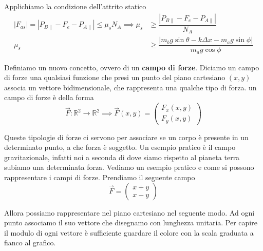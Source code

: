 \documentclass{rapport}
\begin{document}
Applichiamo la condizione dell'attrito statico 
\begin{align*}
|F_{as}| = | P_{B\parallel} - F_e  - P_{A\parallel} | \leq \mu_s N_A \implies \mu_s &\geq \dfrac{ | P_{B\parallel} - F_e  - P_{A\parallel} |}{N_A}\\
\mu_s&\geq \dfrac{ | m_bg\sin\theta - k\Delta x  - m_ag\sin\phi |}{m_ag\cos\phi}
\end{align*}

\newpage
Definiamo un nuovo concetto, ovvero di un \textbf{campo di forze}. Diciamo un campo di forze una qualsiasi funzione che presi un punto del piano cartesiano $(x,y)$ associa un vettore bidimensionale, che rappresenta una qualche tipo di forza. un campo di forze è della forma 
\[
\vec{F}:\mathbb{R}^2 \to \mathbb{R}^2 \implies \vec{F}(x, y) = \begin{pmatrix}
  F_x(x,y) \\
  F_y(x,y)
\end{pmatrix}
\]

Queste tipologie di forze ci servono per associare se un corpo è presente in un determinato punto, a che forza è soggetto. Un esempio pratico è il campo gravitazionale, infatti noi a seconda di dove siamo rispetto al pianeta terra subiamo una determinata forza. Vediamo un esempio pratico e come si possono rappresentare i campi di forze. Prendiamo il seguente campo
\[
\vec{F} = \begin{pmatrix}
  x + y \\
  x - y
\end{pmatrix}
\] 

Allora possiamo rappresentare nel piano cartesiano nel seguente modo. Ad ogni punto associamo il suo vettore che disegnamo con lunghezza unitaria. Per capire il modulo di ogni vettore è sufficiente guardare il colore con la scala graduata a fianco al grafico.
\end{document}
